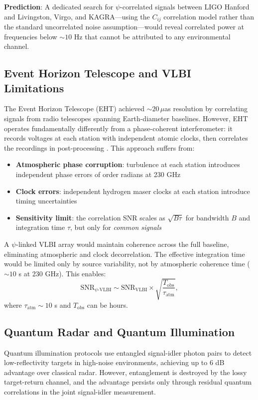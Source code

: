 \documentclass[12pt,a4paper]{article}
\theoremstyle{remark}
\begin{document}
\textbf{Prediction}: A dedicated search for $\psi$-correlated signals
between LIGO Hanford and Livingston, Virgo, and KAGRA---using the
$C_{ij}$ correlation model rather than the standard uncorrelated
noise assumption---would reveal correlated power at frequencies below
$\sim 10$ Hz that cannot be attributed to any environmental channel.

\subsection{Event Horizon Telescope and VLBI Limitations}

The Event Horizon Telescope (EHT) achieved $\sim 20\,\mu$as resolution
by correlating signals from radio telescopes spanning Earth-diameter
baselines. However, EHT operates fundamentally differently from a
phase-coherent interferometer: it records voltages at each station with
independent atomic clocks, then correlates the recordings in post-processing
\cite{EHT2019}. This approach suffers from:
\begin{itemize}
\item \textbf{Atmospheric phase corruption}: turbulence at each station
introduces independent phase errors of order radians at 230 GHz
\item \textbf{Clock errors}: independent hydrogen maser clocks at each
station introduce timing uncertainties
\item \textbf{Sensitivity limit}: the correlation SNR scales as
$\sqrt{B\tau}$ for bandwidth $B$ and integration time $\tau$, but only
for \emph{common signals}
\end{itemize}

A $\psi$-linked VLBI array would maintain coherence across the full baseline,
eliminating atmospheric and clock decorrelation. The effective integration
time would be limited only by source variability, not by atmospheric
coherence time ($\sim 10$ s at 230 GHz). This enables:
\begin{equation}
\text{SNR}_{\psi\text{-VLBI}} \sim \text{SNR}_{\text{VLBI}} \times
\sqrt{\frac{T_{\text{obs}}}{\tau_{\text{atm}}}},
\end{equation}
where $\tau_{\text{atm}} \sim 10$ s and $T_{\text{obs}}$ can be hours.

\subsection{Quantum Radar and Quantum Illumination}

Quantum illumination protocols \cite{Lloyd2008,Tan2008} use entangled
signal-idler photon pairs to detect low-reflectivity targets in high-noise
environments, achieving up to 6 dB advantage over classical radar. However,
entanglement is destroyed by the lossy target-return channel, and the
advantage persists only through residual quantum correlations in the
joint signal-idler measurement.
\end{document}
